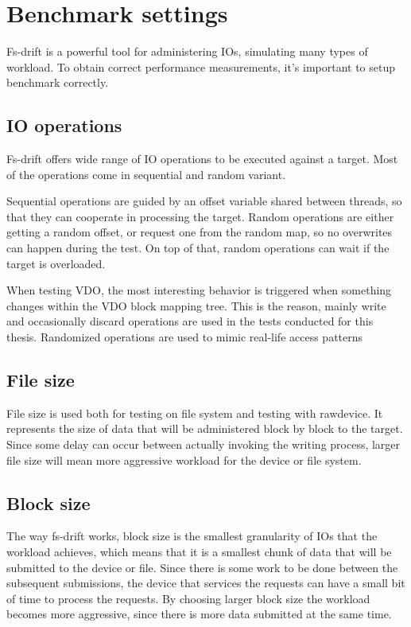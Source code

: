 \documentclass[
  color, %
  table, %
  lof,   %
  lot,   %
]{fithesis3}
\begin{document}
\clearpage


\section{Benchmark settings}
Fs-drift is a powerful tool for administering IOs, simulating many types of workload. To obtain correct performance measurements, it's important to setup benchmark correctly.

\subsection{IO operations}
Fs-drift offers wide range of IO operations to be executed against a target. Most of the operations come in sequential and random variant.

Sequential operations are guided by an offset variable shared between threads, so that they can cooperate in processing the target. Random operations are either getting a random offset, or request one from the random map, so no overwrites can happen during the test. On top of that, random operations can wait if the target is overloaded.

When testing VDO, the most interesting behavior is triggered when something changes within the VDO block mapping tree. This is the reason, mainly write and occasionally discard operations are used in the tests conducted for this thesis. Randomized operations are used to mimic real-life access patterns

\subsection{File size}
File size is used both for testing on file system and testing with rawdevice. It represents the size of data that will be administered block by block to the target. Since some delay can occur between actually invoking the writing process, larger file size will mean more aggressive workload for the device or file system. 

\subsection{Block size}
The way fs-drift works, block size is the smallest granularity of IOs that the workload achieves, which means that it is a smallest chunk of data that will be submitted to the device or file. Since there is some work to be done between the subsequent submissions, the device that services the requests can have a small bit of time to process the requests. By choosing larger block size the workload becomes more aggressive, since there is more data submitted at the same time.
\end{document}
